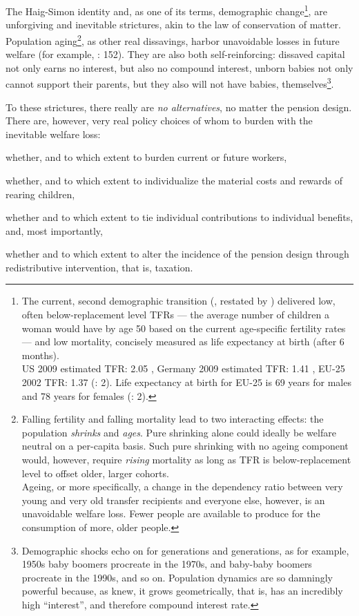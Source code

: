 The Haig-Simon identity and, as one of its terms, demographic change\footnote{
	The current, second demographic transition (\citealt{Davis1945}, restated by \citealt{Caldwell-1976-aa}) delivered low, often below-replacement level \glspl{TFR} --- the average number of children a woman would have by age 50 based on the current age-specific fertility rates --- and low mortality, concisely measured as life expectancy at birth (after 6 months). \\ 
	US 2009 estimated TFR: 2.05 \citep{CIA2009}, Germany 2009 estimated TFR: 1.41 \citep{CIA2009}, EU-25 2002 TFR: 1.37 (\citealt{Demeny-2003-aa}: 2). Life expectancy at birth for EU-25 is 69 years for males and 78 years for females (\citealt{Demeny-2003-aa}: 2).}, 
are unforgiving and inevitable strictures, akin to the law of conservation of matter. Population aging\footnote{
	Falling fertility and falling mortality lead to two interacting effects: the population \emph{shrinks} and \emph{ages}. Pure shrinking alone could ideally be welfare neutral on a per-capita basis. Such pure shrinking with no ageing component would, however, require \emph{rising} mortality as long as TFR is below-replacement level to offset older, larger cohorts.\\
	Ageing, or more specifically, a change in the dependency ratio between very young and very old transfer recipients and everyone else, however, is an unavoidable welfare loss. Fewer people are available to produce for the consumption of more, older people.},
as other real dissavings, harbor unavoidable losses in future welfare (for example, \citealt{Borsch-Supan2003}: 152). They are also both self-reinforcing: dissaved capital not only earns no interest, but also no compound interest, unborn babies not only cannot support their parents, but they also will not have babies, themselves\footnote{
	Demographic shocks echo on for generations and generations, as for example, 1950s baby boomers procreate in the 1970s, and baby-baby boomers procreate in the 1990s, and so on. Population dynamics are so damningly powerful because, as \cite{Malthus1798} knew, it grows geometrically, that is, has an incredibly high ``interest'', and therefore compound interest rate.}.

To these strictures, there really are \emph{no alternatives}, no matter the pension design. There are, however, very real policy choices of whom to burden with the inevitable welfare loss: \begin{inparaenum} \item whether, and to which extent to burden current or future workers, \item whether, and to which extent to individualize the material costs and rewards of rearing children, \item whether and to which extent to tie individual contributions to individual benefits, and, most importantly, \item whether and to which extent to alter the incidence of the pension design through redistributive intervention, that is, taxation. \end{inparaenum}


